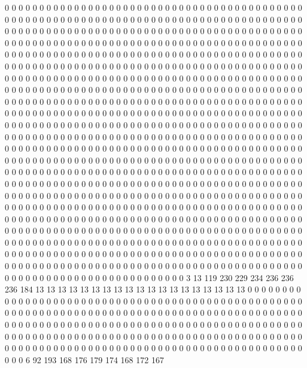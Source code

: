 0 0 0 0 0 0 0 0 0 0 0 0 0 0 0 0 0 0 0 0
0 0 0 0 0 0 0 0 0 0 0 0 0 0 0 0 0 0 0 0
0 0 0 0 0 0 0 0 0 0 0 0 0 0 0 0 0 0 0 0
0 0 0 0 0 0 0 0 0 0 0 0 0 0 0 0 0 0 0 0
0 0 0 0 0 0 0 0 0 0 0 0 0 0 0 0 0 0 0 0
0 0 0 0 0 0 0 0 0 0 0 0 0 0 0 0 0 0 0 0
0 0 0 0 0 0 0 0 0 0 0 0 0 0 0 0 0 0 0 0
0 0 0 0 0 0 0 0 0 0 0 0 0 0 0 0 0 0 0 0
0 0 0 0 0 0 0 0 0 0 0 0 0 0 0 0 0 0 0 0
0 0 0 0 0 0 0 0 0 0 0 0 0 0 0 0 0 0 0 0
0 0 0 0 0 0 0 0 0 0 0 0 0 0 0 0 0 0 0 0
0 0 0 0 0 0 0 0 0 0 0 0 0 0 0 0 0 0 0 0
0 0 0 0 0 0 0 0 0 0 0 0 0 0 0 0 0 0 0 0
0 0 0 0 0 0 0 0 0 0 0 0 0 0 0 0 0 0 0 0
0 0 0 0 0 0 0 0 0 0 0 0 0 0 0 0 0 0 0 0
0 0 0 0 0 0 0 0 0 0 0 0 0 0 0 0 0 0 0 0
0 0 0 0 0 0 0 0 0 0 0 0 0 0 0 0 0 0 0 0
0 0 0 0 0 0 0 0 0 0 0 0 0 0 0 0 0 0 0 0
0 0 0 0 0 0 0 0 0 0 0 0 0 0 0 0 0 0 0 0
0 0 0 0 0 0 0 0 0 0 0 0 0 0 0 0 0 0 0 0
0 0 0 0 0 0 0 0 0 0 0 0 0 0 0 0 0 0 0 0
0 0 0 0 0 0 0 0 0 0 0 0 0 0 0 0 0 0 0 0
0 0 0 0 0 0 0 0 0 0 0 0 0 0 0 0 0 0 0 0
0 0 0 0 0 0 0 0 0 0 0 0 0 0 0 0 0 0 0 0
0 0 0 0 0 0 0 0 0 0 0 0 0 0 0 0 0 0 0 0
0 0 0 0 0 0 0 0 0 0 0 0 0 0 0 0 0 0 0 0
0 0 0 0 0 0 0 0 0 0 0 0 0 0 0 0 0 0 0 0
0 0 0 0 0 0 0 0 0 0 0 0 0 0 0 0 0 0 0 0
0 0 0 0 0 0 0 0 0 0 0 0 0 0 0 0 0 0 0 0
0 0 0 0 0 0 0 0 0 0 0 0 0 0 0 0 0 0 0 0
0 0 0 0 0 0 0 0 0 0 0 0 0 0 0 0 0 0 0 0
0 0 0 0 0 0 0 0 0 0 0 0 0 0 0 0 0 0 0 0
0 0 0 0 0 0 0 0 0 0 0 0 0 0 0 0 0 0 0 0
0 0 0 0 0 0 0 0 0 0 0 0 0 0 0 0 0 0 0 0
0 0 0 0 0 0 0 0 0 0 0 0 0 0 0 0 0 0 0 0
0 0 0 0 0 0 0 0 0 0 0 0 0 0 0 0 0 0 0 0
0 0 0 0 0 0 0 0 0 0 0 0 0 0 0 0 0 0 0 0
0 0 0 0 0 0 0 0 0 0 0 0 0 0 0 0 0 0 0 0
0 0 0 0 0 0 0 0 0 0 0 0 0 0 0 0 0 0 0 0
0 0 0 0 0 0 0 0 0 0 0 0 0 0 0 0 0 0 0 0
0 0 0 0 0 0 0 0 0 0 0 0 0 0 0 0 0 0 0 0
0 0 0 0 0 0 0 0 0 0 0 0 0 0 0 0 0 0 0 0
0 0 0 0 0 0 0 0 0 0 0 0 0 0 0 0 0 0 0 0
0 0 0 0 0 0 0 0 0 0 0 0 0 0 0 0 0 0 0 0
0 0 0 0 0 0 0 0 0 0 0 0 0 0 0 0 0 0 0 0
0 0 0 0 0 0 0 0 0 0 0 0 0 0 0 0 0 0 0 0
0 0 0 0 0 0 0 0 0 0 0 0 0 0 0 0 0 0 0 0
0 0 0 0 0 0 0 0 0 0 0 0 0 0 0 0 0 0 0 0
0 0 0 0 0 0 0 0 0 0 0 0 0 0 0 0 0 0 0 0
0 0 0 0 0 0 0 0 0 0 0 0 0 0 0 0 0 0 0 0
0 0 0 0 0 0 0 0 0 0 0 0 0 0 0 3 13 119 230 229
234 236 236 236 184 13 13 13 13 13 13 13 13 13 13 13 13 13 13 13
13 13 13 13 0 0 0 0 0 0 0 0 0 0 0 0 0 0 0 0
0 0 0 0 0 0 0 0 0 0 0 0 0 0 0 0 0 0 0 0
0 0 0 0 0 0 0 0 0 0 0 0 0 0 0 0 0 0 0 0
0 0 0 0 0 0 0 0 0 0 0 0 0 0 0 0 0 0 0 0
0 0 0 0 0 0 0 0 0 0 0 0 0 0 0 0 0 0 0 0
0 0 0 0 0 0 0 0 0 0 0 0 0 0 0 0 0 0 0 0
0 0 0 0 0 0 0 0 0 0 0 0 0 0 0 0 0 0 0 0
0 0 0 0 0 0 0 0 0 0 0 0 0 0 0 0 0 0 0 0
0 0 0 0 0 0 0 0 0 0 0 0 0 0 0 0 0 0 0 0
0 0 0 0 0 0 0 0 0 0 0 0 0 0 0 0 0 0 0 0
0 0 0 0 0 0 0 0 0 0 0 0 0 0 0 0 0 0 0 0
0 0 0 0 0 0 0 0 0 0 6 92 193 168 176 179 174 168 172 167
